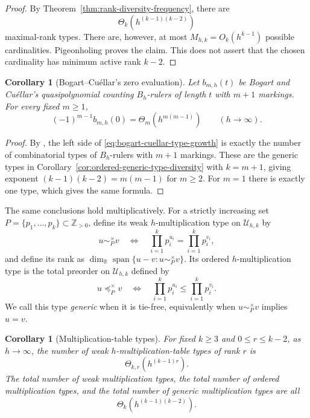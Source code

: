 \documentclass[11pt,reqno]{amsart}
\newtheorem{corollary}[theorem]{Corollary}
\theoremstyle{definition}
\theoremstyle{remark}
\begin{document}
\begin{proof}
By Theorem~\ref{thm:rank-diversity-frequency}, there are
\[
 \Theta_k\!\left(h^{(k-1)(k-2)}\right)
\]
maximal-rank types.  There are, however, at most
$M_{h,k}=O_k(h^{k-1})$ possible cardinalities.  Pigeonholing proves the
claim.  This does not assert that the chosen cardinality has minimum active
rank $k-2$.
\end{proof}

\begin{corollary}[Bogart--Cu\'ellar's zero evaluation]
\label{cor:bogart-cuellar-type-growth}
Let $b_{m,h}(t)$ be Bogart and Cu\'ellar's quasipolynomial counting
$B_h$-rulers of length $t$ with $m+1$ markings. For every fixed $m\geq1$,
\begin{equation}\label{eq:bogart-cuellar-type-growth}
 (-1)^{m-1}b_{m,h}(0)
 =\Theta_m\!\left(h^{m(m-1)}\right)
 \qquad(h\to\infty).
\end{equation}
\end{corollary}

\begin{proof}
By \cite[Theorem~2.5]{BogartCuellar2025}, the left side of
\eqref{eq:bogart-cuellar-type-growth} is exactly the number of
combinatorial types of $B_h$-rulers with $m+1$ markings. These are the
generic types in Corollary~\ref{cor:ordered-generic-type-diversity} with
$k=m+1$, giving exponent
$(k-1)(k-2)=m(m-1)$ for $m\geq2$. For $m=1$ there is exactly one type,
which gives the same formula.
\end{proof}

The same conclusions hold multiplicatively. For a strictly increasing
set $P=\{p_1,\ldots,p_k\}\subset\mathbb Z_{>0}$, define its weak
$h$-multiplication type on $\mathcal U_{h,k}$ by
\[
 u\sim_P^\times v
 \quad\Longleftrightarrow\quad
 \prod_{i=1}^k p_i^{u_i}=\prod_{i=1}^k p_i^{v_i},
\]
and define its rank as
$\dim_{\mathbb R}\operatorname{span}\{u-v:u\sim_P^\times v\}$.
Its ordered $h$-multiplication type is the total preorder on
$\mathcal U_{h,k}$ defined by
\[
 u\preccurlyeq_P^\times v
 \quad\Longleftrightarrow\quad
 \prod_{i=1}^k p_i^{u_i}\leq\prod_{i=1}^k p_i^{v_i}.
\]
We call this type \emph{generic} when it is tie-free, equivalently when
$u\sim_P^\times v$ implies $u=v$.

\begin{corollary}[Multiplication-table types]
\label{cor:multiplicative-type-diversity}
For fixed $k\geq3$ and $0\leq r\leq k-2$, as $h\to\infty$, the number of weak
$h$-multiplication-table types of rank $r$ is
\[
 \Theta_{k,r}\!\left(h^{(k-1)r}\right).
\]
The total number of weak multiplication types, the total number of ordered
multiplication types, and the total number of generic multiplication types
are all
\begin{equation}\label{eq:multiplicative-type-growth}
 \Theta_k\!\left(h^{(k-1)(k-2)}\right).
\end{equation}
\end{corollary}
\end{document}
